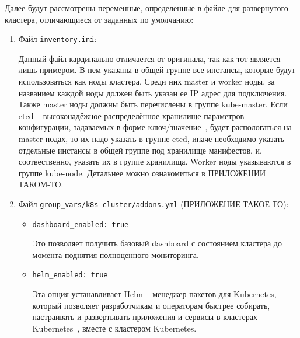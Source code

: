 Далее будут рассмотрены переменные, определенные в файле для развернутого кластера, отличающиеся от заданных по умолчанию:
\begin{enumerate}
    \item Файл \texttt{inventory.ini}:

        Данный файл кардинально отличается от оригинала, так как тот является лишь примером. В нем указаны в общей группе все инстансы, которые будут использоваться как ноды кластера. Среди них master 
        и worker
        ноды, за названием каждой ноды должен быть указан ее IP
        адрес для подключения. Также master ноды должны быть перечислены в группе kube-master. Если etcd -- высоконадёжное распределённое хранилище параметров конфигурации, задаваемых в форме ключ/значение~\cite{def:etcd},
        будет распологаться на master нодах, то их надо указать в группе etcd, иначе необходимо указать отдельные инстансы в общей группе под хранилище манифестов, и, соотвественно, указать их в группе хранилища. Worker ноды указываются в группе kube-node. Детальнее можно ознакомиться в ПРИЛОЖЕНИИ ТАКОМ-ТО.

    \item Файл \texttt{group\_vars/k8s-cluster/addons.yml} (ПРИЛОЖЕНИЕ ТАКОЕ-ТО):
        \begin{itemize}
            \item \texttt{dashboard\_enabled: true}

                Это позволяет получить базовый dashboard
                с состоянием кластера до момента поднятия полноценного мониторинга.

            \item \texttt{helm\_enabled: true}

                Эта опция устанавливает Helm -- менеджер пакетов для Kubernetes, который позволяет разработчикам и операторам быстрее собирать, настраивать и развертывать приложения и сервисы в кластерах Kubernetes~\cite{def:helm},
                вместе с кластером Kubernetes.


\end{itemize}
\end{enumerate}
